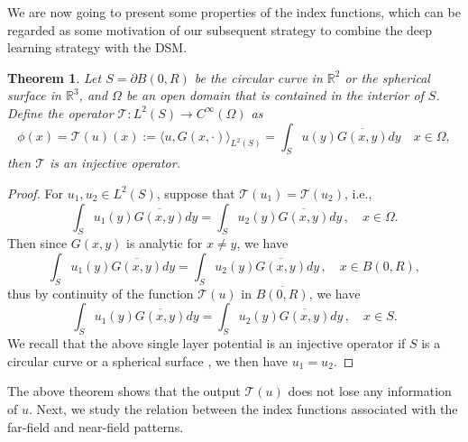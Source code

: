 \documentclass{article}
\newtheorem{theorem}{Theorem}
\begin{document}
	We are now going to present some properties of the index functions, which can be regarded as some motivation of 
	our subsequent strategy to combine the deep learning strategy with the DSM.
	\begin{theorem}
		Let $S=\partial B(0,R)$ be the circular curve in $\mathbb{R}^{2}$ or the spherical surface in $\mathbb{R}^{3}$, and  $\Omega$ be an open domain that is contained in the interior of $S$. Define the operator $\mathcal{T}: L^{2}(S)\rightarrow C^{\infty}(\Omega)$ as
		\begin{equation}
			\phi(x) = \mathcal{T}(u)(x):=\langle u,G(x,\cdot)\rangle_{L^{2}(S)}=\int_{S}u(y)\overline{G(x,y)}dy \quad x \in \Omega,
			\label{operator}
		\end{equation}
		then $\mathcal{T}$ is an injective operator.
		\label{theorem}
	\end{theorem}
	\begin{proof}
		For $u_{1}, u_{2}\in L^2(S)$, suppose that $\mathcal{T}(u_{1})=\mathcal{T}(u_{2})$, i.e.,
		\begin{equation}
			\int_{S}u_{1}(y)\overline{G(x,y)}dy=\int_{S}u_{2}(y)\overline{G(x,y)}dy\,, \quad x \in \Omega.
		\end{equation}
		Then since $G(x,y)$ is analytic for $x\ne y$, we have
		\begin{equation}
			\int_{S}u_{1}(y)\overline{G(x,y)}dy=\int_{S}u_{2}(y)\overline{G(x,y)}dy\,, \quad x \in B(0,R),
		\end{equation}
		thus by continuity of the function $\mathcal{T}(u)$ in $\overline{B(0,R)}$, we have
		\begin{equation}
			\int_{S}u_{1}(y)\overline{G(x,y)}dy=\int_{S}u_{2}(y)\overline{G(x,y)}dy\,, \quad x \in S.
		\end{equation}
		We recall that the above single layer potential is an injective operator if $S$ is a circular curve or a spherical surface \cite{ammari2009layer}, we then have $u_{1}=u_{2}$.
	\end{proof}

The above theorem shows that the output $\mathcal{T}(u)$ does not lose any information of $u$. Next, we study the relation between the index functions associated with the far-field and near-field patterns.
	
\end{document}
